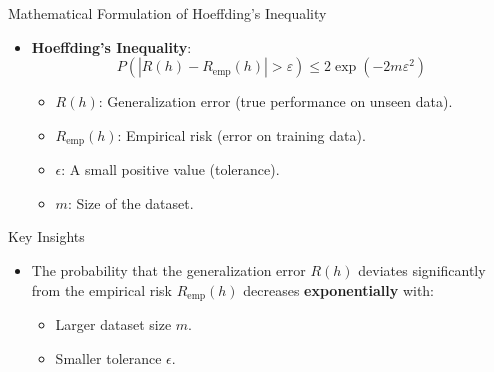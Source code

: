 \documentclass[
  ignorenonframetext,
]{beamer}
\providecommand{\tightlist}{%
  \setlength{\itemsep}{0pt}\setlength{\parskip}{0pt}}\usepackage{longtable,booktabs,array}
\begin{document}
\begin{frame}{Mathematical Formulation of Hoeffding's Inequality}
\label{mathematical-formulation-of-hoeffdings-inequality}
\begin{itemize}
\tightlist
\item
  \textbf{Hoeffding's Inequality}: \[
  P(|R(h) - R_{\text{emp}}(h)| > \varepsilon) \leq 2 \exp(-2m\varepsilon^2)
  \]

  \begin{itemize}
  \tightlist
  \item
    \(R(h)\): Generalization error (true performance on unseen data).
  \item
    \(R_{\text{emp}}(h)\): Empirical risk (error on training data).
  \item
    \(\epsilon\): A small positive value (tolerance).
  \item
    \(m\): Size of the dataset.
  \end{itemize}
\end{itemize}
\end{frame}

\begin{frame}
\begin{block}{Key Insights}
\label{key-insights-2}
\begin{itemize}
\tightlist
\item
  The probability that the generalization error \(R(h)\) deviates
  significantly from the empirical risk \(R_{\text{emp}}(h)\) decreases
  \textbf{exponentially} with:

  \begin{itemize}
  \tightlist
  \item
    Larger dataset size \(m\).
  \item
    Smaller tolerance \(\epsilon\).
  \end{itemize}
\end{itemize}
\end{block}
\end{frame}
\end{document}

